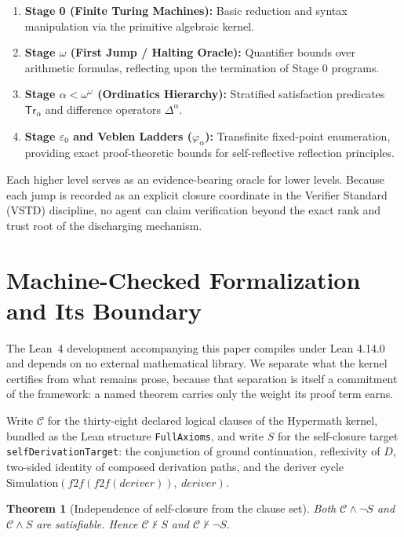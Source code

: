\documentclass[11pt]{article}
\newtheorem{theorem}{Theorem}[section]
\theoremstyle{definition}
\begin{document}
\begin{enumerate}
\item \textbf{Stage 0 (Finite Turing Machines):} Basic reduction and syntax manipulation via the primitive algebraic kernel.
\item \textbf{Stage $\omega$ (First Jump / Halting Oracle):} Quantifier bounds over arithmetic formulas, reflecting upon the termination of Stage 0 programs.
\item \textbf{Stage $\alpha < \omega^\omega$ (Ordinatics Hierarchy):} Stratified satisfaction predicates $\mathsf{Tr}_\alpha$ and difference operators $\Delta^\alpha$.
\item \textbf{Stage $\varepsilon_0$ and Veblen Ladders ($\varphi_\alpha$):} Transfinite fixed-point enumeration, providing exact proof-theoretic bounds for self-reflective reflection principles.
\end{enumerate}

Each higher level serves as an evidence-bearing oracle for lower levels. Because each jump is recorded as an explicit closure coordinate in the Verifier Standard (VSTD) discipline, no agent can claim verification beyond the exact rank and trust root of the discharging mechanism.

\section{Machine-Checked Formalization and Its Boundary}
The Lean~4 development accompanying this paper \cite{hypermath_lean} compiles under Lean 4.14.0 and depends on no external mathematical library. We separate what the kernel certifies from what remains prose, because that separation is itself a commitment of the framework: a named theorem carries only the weight its proof term earns.

Write $\mathcal{C}$ for the thirty-eight declared logical clauses of the Hypermath kernel, bundled as the Lean structure \texttt{FullAxioms}, and write $S$ for the self-closure target \texttt{selfDerivationTarget}: the conjunction of ground continuation, reflexivity of $D$, two-sided identity of composed derivation paths, and the deriver cycle $\mathrm{Simulation}(f2f(f2f(\mathit{deriver})),\ \mathit{deriver})$.

\begin{theorem}[Independence of self-closure from the clause set]
\label{thm:independence}
Both $\mathcal{C} \wedge \neg S$ and $\mathcal{C} \wedge S$ are satisfiable. Hence $\mathcal{C} \nvdash S$ and $\mathcal{C} \nvdash \neg S$.
\end{theorem}
\end{document}
